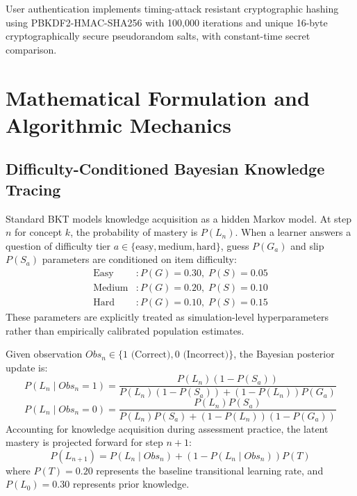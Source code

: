 \documentclass[pdflatex,sn-apa]{sn-jnl}
\begin{document}
User authentication implements timing-attack resistant cryptographic hashing using PBKDF2-HMAC-SHA256 with 100,000 iterations and unique 16-byte cryptographically secure pseudorandom salts, with constant-time secret comparison.

\section{Mathematical Formulation and Algorithmic Mechanics}\label{sec4}

\subsection{Difficulty-Conditioned Bayesian Knowledge Tracing}\label{sec4.1}

Standard BKT models knowledge acquisition as a hidden Markov model. At step $n$ for concept $k$, the probability of mastery is $P(L_n)$. When a learner answers a question of difficulty tier $a \in \{\text{easy}, \text{medium}, \text{hard}\}$, guess $P(G_a)$ and slip $P(S_a)$ parameters are conditioned on item difficulty:
\begin{align}
\text{Easy}&: P(G) = 0.30, \; P(S) = 0.05 \label{eq1}\\
\text{Medium}&: P(G) = 0.20, \; P(S) = 0.10 \label{eq2}\\
\text{Hard}&: P(G) = 0.10, \; P(S) = 0.15 \label{eq3}
\end{align}
These parameters are explicitly treated as simulation-level hyperparameters rather than empirically calibrated population estimates.

Given observation $Obs_n \in \{1 \text{ (Correct)}, 0 \text{ (Incorrect)}\}$, the Bayesian posterior update is:
\begin{equation}
P(L_n \mid Obs_n = 1) = \frac{P(L_n)(1 - P(S_a))}{P(L_n)(1 - P(S_a)) + (1 - P(L_n))P(G_a)}\label{eq4}
\end{equation}
\begin{equation}
P(L_n \mid Obs_n = 0) = \frac{P(L_n)P(S_a)}{P(L_n)P(S_a) + (1 - P(L_n))(1 - P(G_a))}\label{eq5}
\end{equation}
Accounting for knowledge acquisition during assessment practice, the latent mastery is projected forward for step $n+1$:
\begin{equation}
P(L_{n+1}) = P(L_n \mid Obs_n) + (1 - P(L_n \mid Obs_n)) P(T)\label{eq6}
\end{equation}
where $P(T) = 0.20$ represents the baseline transitional learning rate, and $P(L_0) = 0.30$ represents prior knowledge.
\end{document}

